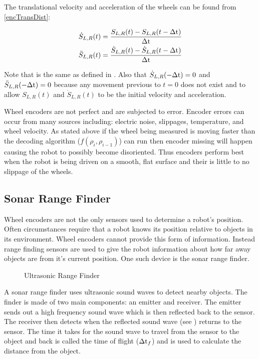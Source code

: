 \documentclass[main.tex]{subfiles}
\begin{document}
The translational velocity and acceleration of the wheels can be found from \eqref{encTransDist}:

\begin{eqnarray}
\label{eq:encTransSpeed}
\dot{S}_{L,R}(t) = \frac{S_{L,R}(t)-S_{L,R}(t-\Delta\mathrm{t})}{\Delta\mathrm{t}}
\\
\ddot{S}_{L,R}(t) = \frac{\dot{S}_{L,R}(t)-\dot{S}_{L,R}(t-\Delta\mathrm{t})}{\Delta\mathrm{t}}
\end{eqnarray}

Note that \delt is the same as defined in . Also that
$\dot{S}_{L,R}(-\Delta\mathrm{t}) = 0$ and $\ddot{S}_{L,R}(-\Delta\mathrm{t}) = 0$ because any
movement previous to $t=0$ does not exist and to allow $S_{L,R}(t)$ and
$\dot{S}_{L,R}(t)$ to be the initial velocity and acceleration.

Wheel encoders are not perfect and are subjected to error. Encoder errors can
occur from many sources including: electric noise, slippages, temperature, and
wheel velocity. As stated above if the wheel being measured is moving faster
than the decoding algorithm ($f(\rho_i,\rho_{i-1})$) can run then encoder
missing will happen causing the robot to possibly become disoriented. Thus
encoders perform best when the robot is being driven on a smooth, flat surface
and their is little to no slippage of the wheels. 

\subsection{Sonar Range Finder}
Wheel encoders are not the only sensors used to determine a robot's position.
Often circumstances require that a robot knows its position relative to objects
in its environment. Wheel encoders cannot provide this form of information.
Instead range finding sensors are used to give the robot information about how
far away objects are from it's current position. One such device is the sonar
range finder. 

\begin{figure}[h]
	\begin{center}
		
	\end{center}
	\caption{Ultrasonic Range Finder}
	\label{fig:ultraSon}
\end{figure}

A sonar range finder uses ultrasonic sound waves to detect nearby objects. The
finder is made of two main components: an emitter and receiver. The emitter
sends out a high frequency sound wave which is then reflected back to the
sensor. The receiver then detects when the reflected sound wave (see
) returns to the sensor. The time it takes for the sound wave
to travel from the sensor to the object and back is called the time of flight
($\Delta\mathrm{t}_f$) and is used to calculate the distance from the object. 
\end{document}

